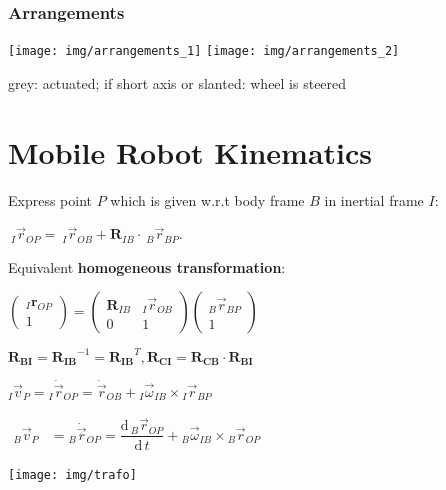 \documentclass[fontsize=6pt]{scrartcl}
\newcommand{\mat}[1]{\mathbf{#1}}
\begin{document}
\begin{multicols*}{4}
\begin{samepage}
\subsubsection*{Arrangements}
{\centering
\texttt{[image: img/arrangements\_1]}%
\texttt{[image: img/arrangements\_2]}
\par}
\end{samepage}

grey: actuated; if short axis or slanted: wheel is steered



\section*{Mobile Robot Kinematics}


\begin{minipage}{0.65\linewidth}
Express point $P$ which is given w.r.t body frame $B$ in inertial frame $I$:

$~_I \vec{r}_{OP} = ~_I\vec{r}_{OB} + \mat{R}_{IB}\cdot ~_B\vec{r}_{BP}$.


Equivalent \textbf{homogeneous transformation}:

$
\begin{pmatrix}
{}_I\mathbf{r}_{OP} \\
1
\end{pmatrix}
=
\begin{pmatrix}
\mat{R}_{IB} & {}_I\vec{r}_{OB} \\
0 & 1
\end{pmatrix}
\begin{pmatrix}
{}_B\vec{r}_{BP} \\
1
\end{pmatrix}
$

$\mat{R_{BI}} = \mat{R_{IB}}^{-1} = \mat{R_{IB}}^{T}, \mat{R_{CI}} = \mat{R_{CB}} \cdot  \mat{R_{BI}}$

${}_I \vec v_P = {}_I \dot{\vec r}_{OP} = \dot{\vec r}_{OB} +
{}_I\vec{\omega}_{IB} \times {}_I\vec r_{BP}$

$
\begin{aligned}
{}_B\vec v_P &= {}_B\dot{\vec r}_{OP} = \dfrac{\mathrm	d\, {}_B\vec r_{OP}}{\mathrm d \,t} + {}_B\vec\omega_{IB} \times {}_B\vec r_{OP}
\end{aligned}
$
\end{minipage}
\begin{minipage}{0.35\linewidth}
\texttt{[image: img/trafo]}
\end{minipage}


\end{multicols*}
\end{document}
